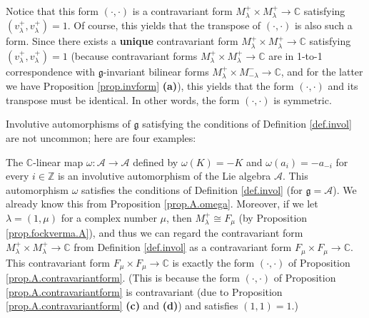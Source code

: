 \documentclass[etingof-lie.tex]{subfiles}
\begin{document}
\begin{definition}
Notice that this form $\left(  \cdot,\cdot\right)  $ is a contravariant form
$M_{\lambda}^{+}\times M_{\lambda}^{+}\rightarrow\mathbb{C}$ satisfying
$\left(  v_{\lambda}^{+},v_{\lambda}^{+}\right)  =1$. Of course, this yields
that the transpose of $\left(  \cdot,\cdot\right)  $ is also such a form.
Since there exists a \textbf{unique} contravariant form $M_{\lambda}^{+}\times
M_{\lambda}^{+}\rightarrow\mathbb{C}$ satisfying $\left(  v_{\lambda}%
^{+},v_{\lambda}^{+}\right)  =1$ (because contravariant forms $M_{\lambda}%
^{+}\times M_{\lambda}^{+}\rightarrow\mathbb{C}$ are in 1-to-1 correspondence
with $\mathfrak{g}$-invariant bilinear forms $M_{\lambda}^{+}\times
M_{-\lambda}^{-}\rightarrow\mathbb{C}$, and for the latter we have Proposition
\ref{prop.invform} \textbf{(a)}), this yields that the form $\left(
\cdot,\cdot\right)  $ and its transpose must be identical. In other words, the
form $\left(  \cdot,\cdot\right)  $ is symmetric.
\end{definition}

Involutive automorphisms of $\mathfrak{g}$ satisfying the conditions of
Definition \ref{def.invol} are not uncommon; here are four examples:

\begin{proposition}
\label{prop.invol.A}The $\mathbb{C}$-linear map $\omega:\mathcal{A}%
\rightarrow\mathcal{A}$ defined by $\omega\left(  K\right)  =-K$ and
$\omega\left(  a_{i}\right)  =-a_{-i}$ for every $i\in\mathbb{Z}$ is an
involutive automorphism of the Lie algebra $\mathcal{A}$. This automorphism
$\omega$ satisfies the conditions of Definition \ref{def.invol} (for
$\mathfrak{g}=\mathcal{A}$). We already know this from Proposition
\ref{prop.A.omega}. Moreover, if we let $\lambda=\left(  1,\mu\right)  $ for a
complex number $\mu$, then $M_{\lambda}^{+}\cong F_{\mu}$ (by Proposition
\ref{prop.fockverma.A}), and thus we can regard the contravariant form
$M_{\lambda}^{+}\times M_{\lambda}^{+}\rightarrow\mathbb{C}$ from Definition
\ref{def.invol} as a contravariant form $F_{\mu}\times F_{\mu}\rightarrow
\mathbb{C}$. This contravariant form $F_{\mu}\times F_{\mu}\rightarrow
\mathbb{C}$ is exactly the form $\left(  \cdot,\cdot\right)  $ of Proposition
\ref{prop.A.contravariantform}. (This is because the form $\left(  \cdot
,\cdot\right)  $ of Proposition \ref{prop.A.contravariantform} is
contravariant (due to Proposition \ref{prop.A.contravariantform} \textbf{(c)}
and \textbf{(d)}) and satisfies $\left(  1,1\right)  =1$.)
\end{proposition}
\end{document}
